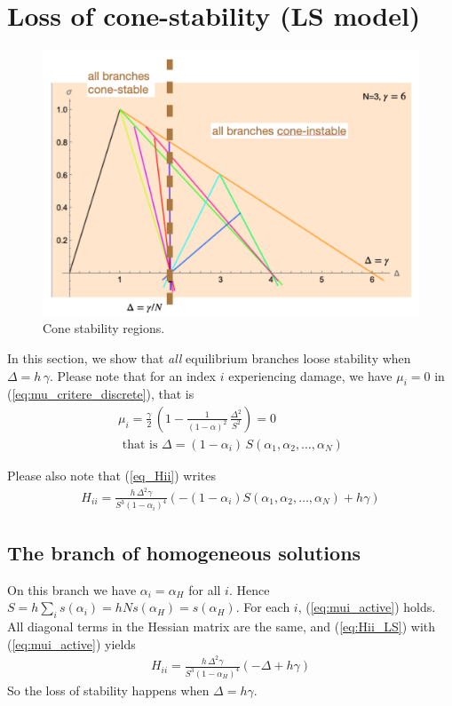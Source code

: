 \documentclass[final,3p,times,authoryear]{elsarticle}
\begin{document}
\section{Loss of cone-stability (LS model)} \label{sec:loss_stab}
%
%
%
%
%
\begin{figure}[htb]
\centering
\includegraphics[width=0.495 \columnwidth]{ls_cone_stab}
\caption{\label{fig:LS_cone_stab} Cone stability regions.}
\end{figure}
%
%
In this section, we show that {\em all} equilibrium branches loose stability when $\Delta=h \, \gamma$.
Please note that for an index $i$ experiencing damage, we have $\mu_i=0$ in (\ref{eq:mu_critere_discrete}), that is
\begin{subequations}
\begin{align}
\mu_i = \frac{\gamma}{2} \, \left( 1 - \frac{1}{(1-\alpha)^2} \, \frac{\Delta^2}{S^2} \right)=0 \label{eq:mui_active} \\
\text{ that is } \Delta = (1-\alpha_i) \, S(\alpha_1, \alpha_2, \ldots, \alpha_N) \label{eq:rel_delta_S}
\end{align}
\end{subequations}

Please also note that (\ref{eq_Hii}) writes
\begin{align}
\label{eq:Hii_LS}
H_{ii} = \frac{h \, \Delta^2 \gamma}{S^3 (1-\alpha_i)^4} \left( -(1-\alpha_i) S(\alpha_1, \alpha_2, \ldots, \alpha_N) + h \gamma \right)
\end{align}

\subsection{The branch of homogeneous solutions}
On this branch we have $\alpha_i = \alpha_H$ for all $i$.
Hence $S=h \sum_i s(\alpha_i) = h N s(\alpha_H)=s(\alpha_H)$.
For each $i$, (\ref{eq:mui_active}) holds.
All diagonal terms in the Hessian matrix are the same, and (\ref{eq:Hii_LS}) with (\ref{eq:mui_active}) yields
\begin{align}
\label{eq:Hii_LS_bis}
H_{ii} = \frac{h \, \Delta^2 \gamma}{S^3 (1-\alpha_H)^4} \left( -\Delta + h \gamma \right)
\end{align}
So the loss of stability happens when $\Delta = h \gamma$.
\end{document}

